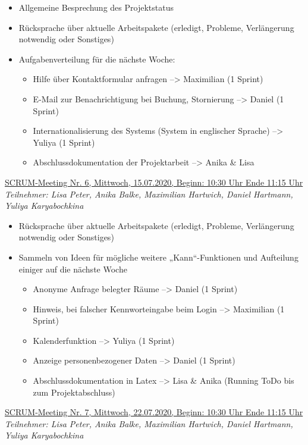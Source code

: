 \documentclass[a4paper,report,headsepline]{scrreprt}
\begin{document}
\begin{itemize}
\item Allgemeine Besprechung des Projektstatus
\item Rücksprache über aktuelle Arbeitspakete (erledigt, Probleme, Verlängerung notwendig oder Sonstiges)
\item Aufgabenverteilung für die nächste Woche:
\begin{itemize}
\item Hilfe über Kontaktformular anfragen --> Maximilian (1 Sprint)
\item E-Mail zur Benachrichtigung bei Buchung, Stornierung --> Daniel (1 Sprint)
\item Internationalisierung des Systems (System in englischer Sprache) 
--> Yuliya (1 Sprint)
\item Abschlussdokumentation der Projektarbeit --> Anika \& Lisa

\end{itemize}
\end{itemize}
 \underline{{\large SCRUM-Meeting Nr. 6, Mittwoch, 15.07.2020, Beginn: 10:30 Uhr Ende 11:15 Uhr}}  \\
\textit{Teilnehmer: Lisa Peter, Anika Balke, Maximilian Hartwich, Daniel Hartmann, Yuliya Karyabochkina}

\begin{itemize}
\item Rücksprache über aktuelle Arbeitspakete (erledigt, Probleme, Verlängerung notwendig oder Sonstiges)
\item Sammeln von Ideen für mögliche weitere „Kann“-Funktionen und Aufteilung einiger auf die nächste Woche
\begin{itemize}
\item Anonyme Anfrage belegter Räume --> Daniel (1 Sprint)
\item Hinweis, bei falscher Kennworteingabe beim Login --> Maximilian (1 Sprint)
\item Kalenderfunktion --> Yuliya (1 Sprint)
\item Anzeige personenbezogener Daten --> Daniel (1 Sprint)
\item Abschlussdokumentation in Latex --> Lisa \& Anika (Running ToDo bis zum Projektabschluss)

\end{itemize}
\end{itemize}
 \underline{{\large SCRUM-Meeting Nr. 7, Mittwoch, 22.07.2020, Beginn: 10:30 Uhr Ende 11:15 Uhr}}  \\
\textit{Teilnehmer: Lisa Peter, Anika Balke, Maximilian Hartwich, Daniel Hartmann, Yuliya Karyabochkina}
\end{document}

